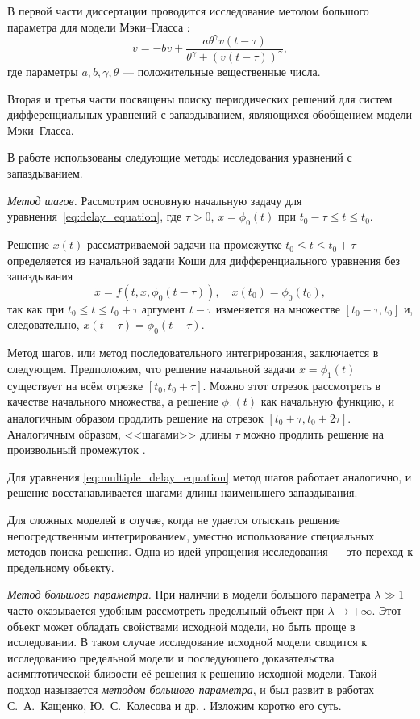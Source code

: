 В первой части диссертации проводится исследование методом большого параметра для модели Мэки--Гласса \cite{Mackey1977, Glass1988}:
\begin{equation}
	\label{eq:mg_equation_1:intro}
	\dot{v}=-b v+\frac{a \theta^{\gamma} v(t-\tau)}{\theta^{\gamma}+(v(t-\tau))^{\gamma}},
\end{equation}
где параметры $a, b, \gamma, \theta$ --- положительные вещественные числа.

Вторая и третья части посвящены поиску периодических решений для систем дифференциальных уравнений с запаздыванием, являющихся обобщением модели Мэки--Гласса.

{\methods} В работе использованы следующие методы исследования уравнений с запаздыванием.

\textit{Метод шагов.} Рассмотрим основную начальную задачу для уравнения~\eqref{eq:delay_equation}, где $\tau > 0$, $x = \phi_0(t)$ при $t_0 - \tau \leq t \leq t_0$.

Решение $x(t)$ рассматриваемой задачи на промежутке $t_0 \leq t \leq t_0 + \tau$ определяется из начальной задачи Коши для дифференциального уравнения без запаздывания
%
\[
\dot{x} = f(t, x, \phi_0(t - \tau)),\quad x(t_0) = \phi_0(t_0),
\]
%
так как при $t_0 \leq t \leq t_0 + \tau$ аргумент $t - \tau$ изменяется на множестве $[t_0 - \tau, t_0]$ и, следовательно, $x(t - \tau) = \phi_0(t - \tau)$.

Метод шагов, или метод последовательного интегрирования, заключается в следующем. Предположим, что решение начальной задачи $x = \phi_1(t)$ существует на всём отрезке $[t_0, t_0 + \tau]$. Можно этот отрезок рассмотреть в качестве начального множества, а решение $\phi_1(t)$ как начальную функцию, и аналогичным образом продлить решение на отрезок $[t_0 + \tau, t_0 + 2\tau]$. Аналогичным образом, <<шагами>> длины $\tau$ можно продлить решение на произвольный промежуток \cite{Elsgoltz}.

Для уравнения \eqref{eq:multiple_delay_equation} метод шагов работает аналогично, и решение восстанавливается шагами длины наименьшего запаздывания.

Для сложных моделей в случае, когда не удается отыскать решение непосредственным интегрированием, уместно использование специальных методов поиска решения. Одна из идей упрощения исследования --- это переход к предельному объекту.

\textit{Метод большого параметра.} При наличии в модели большого параметра $\lambda \gg 1$ часто оказывается удобным рассмотреть предельный объект при $\lambda \to +\infty$. Этот объект может обладать свойствами исходной модели, но быть проще в исследовании. В таком случае исследование исходной модели сводится к исследованию предельной модели и последующего доказательства асимптотической близости её решения к решению исходной модели. Такой подход называется \emph{методом большого параметра}, и был развит в работах С.~А.~Кащенко, Ю.~С.~Колесова и др. \cite{Kashchenko1982, Kashchenko1983, KolesovKolesov1993, Kolesov2010}. Изложим коротко его суть.

